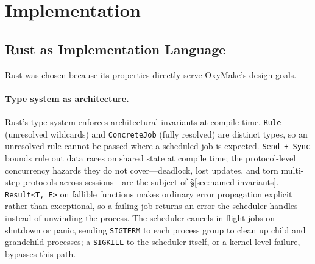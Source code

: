 \documentclass[12pt,a4paper]{article}
\newcommand{\code}[1]{{\texttt{\small\color{inlinecode}#1}}}
\begin{document}
\section{Implementation}
\label{sec:implementation}

\subsection{Rust as Implementation Language}
\label{sec:rust}

Rust was chosen because its properties directly serve OxyMake's design goals.

\paragraph{Type system as architecture.}
Rust's type system enforces architectural invariants at compile time.
\code{Rule} (unresolved wildcards) and \code{ConcreteJob} (fully resolved)
are distinct types, so an unresolved rule cannot be passed where a
scheduled job is expected. \code{Send + Sync} bounds rule out data
races on shared state at compile time; the protocol-level concurrency
hazards they do not cover---deadlock, lost updates, and torn multi-step
protocols across sessions---are the subject of
\S\ref{sec:named-invariants}. \code{Result<T, E>}
on fallible functions makes ordinary error propagation explicit rather
than exceptional, so a failing job returns an error the scheduler
handles instead of unwinding the process. The scheduler cancels
in-flight jobs on shutdown or panic, sending \code{SIGTERM} to each
process group to clean up child and grandchild processes; a
\code{SIGKILL} to the scheduler itself, or a kernel-level failure,
bypasses this path.
\end{document}
